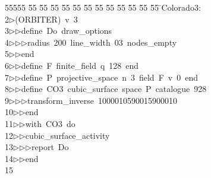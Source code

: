 %
%
\begin{tabbing}
55555 \= 55 \= 55 \= 55 \= 55 \= 55 \= 55 \= 55 \= 55 \= 55 \= 55 \= 55 \= 55 \= \>Colorado3:\\[0pt]
2\>$\triangleright$\>(ORBITER)\ v\ 3\ \\[0pt]
3\>$\triangleright$\>$\triangleright$\>define\ Do\ draw\_options\ \\[0pt]
4\>$\triangleright$\>$\triangleright$\>$\triangleright$\>radius\ 200\ line\_width\ 03\ nodes\_empty\ \\[0pt]
5\>$\triangleright$\>$\triangleright$\>end\ \\[0pt]
6\>$\triangleright$\>$\triangleright$\>define\ F\ finite\_field\ q\ 128\ end\ \\[0pt]
7\>$\triangleright$\>$\triangleright$\>define\ P\ projective\_space\ n\ 3\ field\ F\ v\ 0\ end\ \\[0pt]
8\>$\triangleright$\>$\triangleright$\>define\ CO3\ cubic\_surface\ space\ P\ catalogue\ 928\ \\[0pt]
9\>$\triangleright$\>$\triangleright$\>$\triangleright$\>transform\_inverse\ 1000010590015900010\ \\[0pt]
10\>$\triangleright$\>$\triangleright$\>end\ \\[0pt]
11\>$\triangleright$\>$\triangleright$\>with\ CO3\ do\ \\[0pt]
12\>$\triangleright$\>$\triangleright$\>cubic\_surface\_activity\ \\[0pt]
13\>$\triangleright$\>$\triangleright$\>$\triangleright$\>report\ Do\ \\[0pt]
14\>$\triangleright$\>$\triangleright$\>end\\[0pt]
15\>\end{tabbing}
